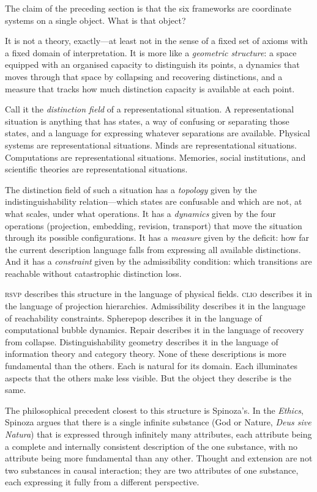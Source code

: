 \documentclass[12pt, letterpaper]{article}
\theoremstyle{remark}
\newcommand{\rsvp}{\textsc{rsvp}}
\newcommand{\clio}{\textsc{clio}}
\begin{document}
The claim of the preceding section is that the six frameworks are coordinate
systems on a single object.  What is that object?

It is not a theory, exactly---at least not in the sense of a fixed set of
axioms with a fixed domain of interpretation.  It is more like a
\emph{geometric structure}: a space equipped with an organised capacity to
distinguish its points, a dynamics that moves through that space by
collapsing and recovering distinctions, and a measure that tracks how much
distinction capacity is available at each point.

Call it the \emph{distinction field} of a representational situation.
A representational situation is anything that has states, a way of confusing
or separating those states, and a language for expressing whatever separations
are available.  Physical systems are representational situations.  Minds are
representational situations.  Computations are representational situations.
Memories, social institutions, and scientific theories are representational
situations.

The distinction field of such a situation has a \emph{topology} given by
the indistinguishability relation---which states are confusable and which
are not, at what scales, under what operations.  It has a \emph{dynamics}
given by the four operations (projection, embedding, revision, transport)
that move the situation through its possible configurations.  It has a
\emph{measure} given by the deficit: how far the current description language
falls from expressing all available distinctions.  And it has a
\emph{constraint} given by the admissibility condition: which transitions
are reachable without catastrophic distinction loss.

\rsvp{} describes this structure in the language of physical fields.
\clio{} describes it in the language of projection hierarchies.  Admissibility
describes it in the language of reachability constraints.  Spherepop describes
it in the language of computational bubble dynamics.  Repair describes it in
the language of recovery from collapse.  Distinguishability geometry describes
it in the language of information theory and category theory.  None of these
descriptions is more fundamental than the others.  Each is natural for its
domain.  Each illuminates aspects that the others make less visible.  But
the object they describe is the same.

The philosophical precedent closest to this structure is Spinoza's.  In the
\textit{Ethics}, Spinoza argues that there is a single infinite substance
(God or Nature, \textit{Deus sive Natura}) that is expressed through
infinitely many attributes, each attribute being a complete and internally
consistent description of the one substance, with no attribute being more
fundamental than any other.  Thought and extension are not two substances in
causal interaction; they are two attributes of one substance, each expressing
it fully from a different perspective.
\end{document}
